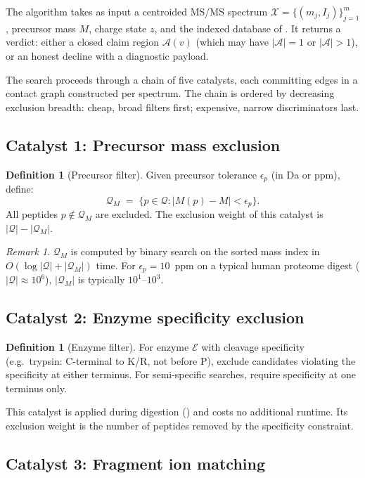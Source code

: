 \documentclass[11pt,a4paper]{article}
\theoremstyle{definition}
\newtheorem{definition}[theorem]{Definition}
\theoremstyle{remark}
\newtheorem{remark}[theorem]{Remark}
\newcommand{\amb}{\mathcal{A}}
\newcommand{\Pep}{\mathcal{Q}}
\newcommand{\Spec}{\mathcal{X}}
\begin{document}
The algorithm takes as input a centroided MS/MS spectrum
$\Spec=\{(m_j,I_j)\}_{j=1}^{m}$, precursor mass $M$, charge state $z$,
and the indexed database of . It returns a verdict:
either a closed claim region $\amb(v)$ (which may have $|\amb|=1$ or
$|\amb|>1$), or an honest decline with a diagnostic payload.

The search proceeds through a chain of five catalysts, each committing
edges in a contact graph constructed per spectrum. The chain is ordered
by decreasing exclusion breadth: cheap, broad filters first; expensive,
narrow discriminators last.

\subsection{Catalyst 1: Precursor mass exclusion}

\begin{definition}[Precursor filter]
\label{def:prec}
Given precursor tolerance $\epsilon_p$ (in Da or ppm), define:
\[
  \Pep_M \;=\; \{p\in\Pep : |M(p)-M|<\epsilon_p\}.
\]
All peptides $p\notin\Pep_M$ are excluded. The exclusion weight of this
catalyst is $|\Pep|-|\Pep_M|$.
\end{definition}

\begin{remark}
$\Pep_M$ is computed by binary search on the sorted mass index in
$O(\log|\Pep|+|\Pep_M|)$ time. For $\epsilon_p=10$~ppm on a
typical human proteome digest ($|\Pep|\approx 10^6$), $|\Pep_M|$ is
typically $10^1$--$10^3$.
\end{remark}

\subsection{Catalyst 2: Enzyme specificity exclusion}

\begin{definition}[Enzyme filter]
\label{def:enzyme}
For enzyme $\mathcal{E}$ with cleavage specificity (e.g.\ trypsin:
C-terminal to K/R, not before P), exclude candidates violating the
specificity at either terminus. For semi-specific searches, require
specificity at one terminus only.
\end{definition}

This catalyst is applied during digestion () and costs
no additional runtime. Its exclusion weight is the number of peptides
removed by the specificity constraint.

\subsection{Catalyst 3: Fragment ion matching}
\end{document}
